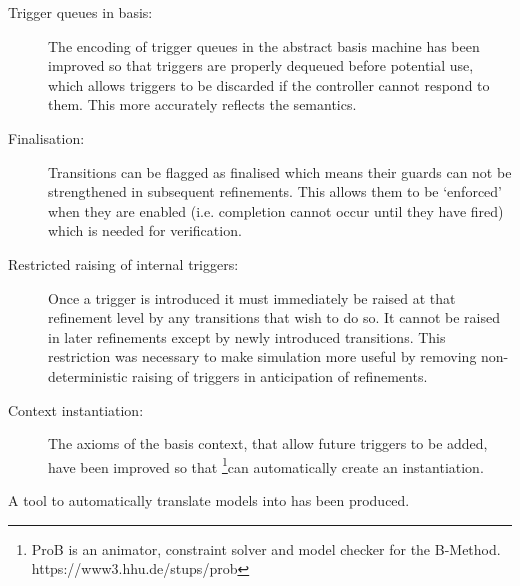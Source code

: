 \begin{description}
\item[Trigger queues in basis:]
  \begin{sloppypar}
    The encoding of trigger queues in the abstract basis machine has been improved so that triggers are properly dequeued before potential use,
    which allows triggers to be discarded if the controller cannot respond to them.
    This more accurately reflects the \SCXML semantics.
  \end{sloppypar}

\item[Finalisation:] Transitions can be flagged as finalised which means their guards can not be strengthened in subsequent refinements. This allows them to be `enforced' when they are enabled (i.e. completion cannot occur until they have fired) which is needed for verification.

\item[Restricted raising of internal triggers:] Once a trigger is introduced it must immediately be raised at that refinement level by any transitions that wish to do so. It cannot be raised in later refinements except by newly introduced transitions. This restriction was necessary to make simulation more useful by removing non-deterministic raising of triggers in anticipation of refinements.

\item[Context instantiation:] The axioms of the basis context, that allow future triggers to be added, have been improved so that \PROB\footnote{ProB is an animator, constraint solver and model checker for the B-Method. https://www3.hhu.de/stups/prob}can automatically create an instantiation.

\end{description}

A tool to automatically translate \SCXML models into \UMLB has been produced.

